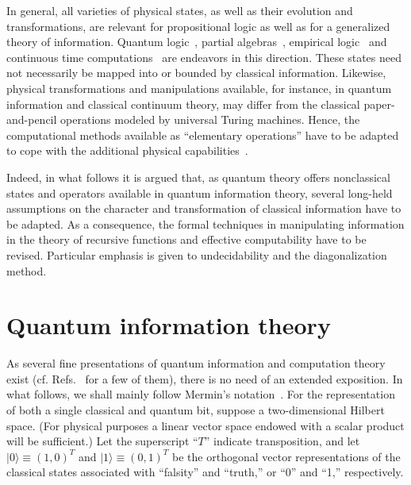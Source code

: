 \documentclass[prl,amsfonts,amsmath,showpacs,showkeys,preprint]{revtex4}
\begin{document}
In general, all varieties of physical states, as well as their evolution and transformations, are relevant
for propositional logic as well as for a generalized theory of information.
Quantum logic~\cite{birkhoff-36}, partial algebras~\cite{kochen2,kochen3},
empirical logic~\cite{Foulis-Piron-Randall,Randall-Foulis} and continuous time computations~\cite{CIEChapter2007}
are endeavors in this direction.
These states need not necessarily be mapped into or bounded by classical information.
Likewise, physical transformations and manipulations available, for instance, in quantum information
and classical continuum theory, may
differ from the classical paper-and-pencil operations modeled by universal Turing machines.
Hence, the computational methods available as ``elementary operations''
have to be adapted to cope with the additional physical capabilities~\cite{deutsch}.

Indeed, in what follows it is argued that,
as quantum theory offers nonclassical states and operators available in quantum information theory,
several long-held assumptions on the character and transformation of classical information have to be adapted.
As a consequence, the formal techniques in manipulating information
in the theory of recursive functions and effective computability have to be revised.
Particular emphasis is given to undecidability and the diagonalization method.




\section{Quantum information theory}

As several fine presentations of quantum information and computation theory exist (cf. Refs.~\cite{Gruska,nielsen-book,Spiller-01,Brylinski-2002,Hayashi-06,Imai-Hayashi-06,arXiv:0802.4155,jaeger-2007,mermin-07}
for a few of them), there is no need of an extended exposition.
In what follows, we shall mainly follow Mermin's notation~\cite{mermin-02,mermin-07}.
For the representation of both a single classical and quantum bit,
suppose a two-dimensional Hilbert space. (For physical purposes
a linear vector space endowed with a scalar product will be sufficient.)
Let the superscript ``$T$'' indicate transposition,
and let $\vert 0\rangle \equiv (1,0)^T$ and $\vert 1\rangle \equiv (0,1)^T$ be the orthogonal vector representations of the
classical states associated with ``falsity'' and ``truth,'' or ``0'' and ``1,'' respectively.
\end{document}
